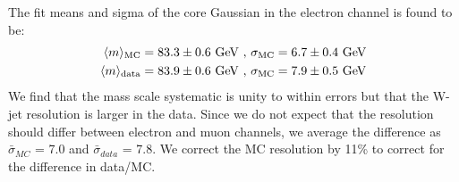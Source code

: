The fit means and sigma of the core Gaussian in the electron channel is found to be:
\begin{eqnarray}
\langle m \rangle_{\rm MC} = 83.3 \pm 0.6~{\rm GeV}{\rm {~,~}}\sigma_{\rm MC} = 6.7 \pm 0.4~{\rm GeV} \\
\langle m \rangle_{\rm data} = 83.9 \pm 0.6~{\rm GeV}{\rm {~,~}}\sigma_{\rm MC} = 7.9 \pm 0.5~{\rm GeV}
\end{eqnarray}
We find that the mass scale systematic is unity to within errors but that the W-jet resolution is larger in the data.
Since we do not expect that the resolution should differ between electron and muon channels, we average the difference as 
$\bar{\sigma}_{MC}$  = 7.0 and $\bar{\sigma}_{data}$  = 7.8. 
We correct the MC resolution by 11\% to correct for the difference in data/MC.

